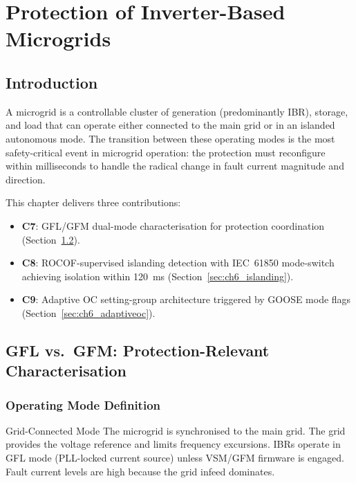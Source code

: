 \chapter{Protection of Inverter-Based Microgrids}
\label{ch:microgrid}

\section{Introduction}
\label{sec:ch6_intro}

A microgrid is a controllable cluster of generation (predominantly IBR),
storage, and load that can operate either connected to the main grid or
in an islanded autonomous mode. The transition between these operating modes
is the most safety-critical event in microgrid operation: the protection
must reconfigure within milliseconds to handle the radical change in fault
current magnitude and direction.

This chapter delivers three contributions:
\begin{itemize}
\item \textbf{C7}: GFL/GFM dual-mode characterisation for protection
      coordination (Section~\ref{sec:ch6_characterisation}).
\item \textbf{C8}: ROCOF-supervised islanding detection with IEC~61850
      mode-switch achieving isolation within 120~ms
      (Section~\ref{sec:ch6_islanding}).
\item \textbf{C9}: Adaptive OC setting-group architecture triggered by
      GOOSE mode flags (Section~\ref{sec:ch6_adaptiveoc}).
\end{itemize}

\section{GFL vs.\ GFM: Protection-Relevant Characterisation}
\label{sec:ch6_characterisation}

\subsection{Operating Mode Definition}

\begin{thesisdef}{Grid-Connected Mode}
The microgrid is synchronised to the main grid. The grid provides the
voltage reference and limits frequency excursions. IBRs operate in GFL
mode (PLL-locked current source) unless VSM/GFM firmware is engaged.
Fault current levels are high because the grid infeed dominates.
\end{thesisdef}


